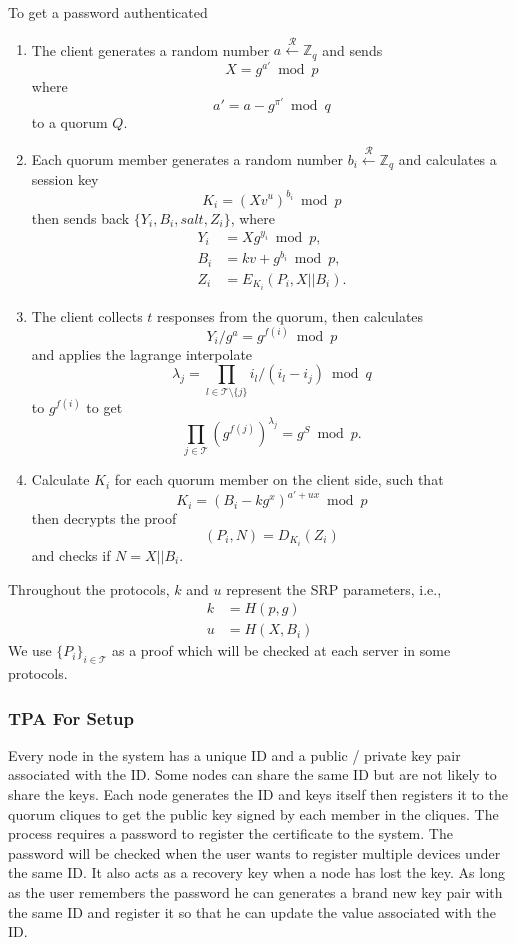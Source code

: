 To get a password authenticated
\begin{enumerate}
\item The client generates a random number
  $a \xleftarrow{\mathcal{R}} \mathbb{Z}_q$
  and sends
  \[
    X = g^{a'} \bmod p
  \]
  where
  \[
    a' = a - g^{\pi'} \bmod q
  \]
  to a quorum $Q$.
\item Each quorum member generates a random number
  $b_i \xleftarrow{\mathcal{R}} \mathbb{Z}_q$
  and calculates a session key
  \[ K_i = (Xv^u)^{b_i} \bmod p \]
  then sends back $\{Y_i, B_i, salt, Z_i\}$,
  where
  \begin{align*}
    Y_i &= X g^{y_i} \bmod p, \\
    B_i &= kv + g^{b_i} \bmod p, \\
    Z_i &= E_{K_i}(P_i, X ||B_i).
  \end{align*}
\item The client collects $t$ responses from the quorum, then
  calculates
  \[
    Y_i/g^a = g^{f(i)} \bmod p
  \]
  and applies the lagrange interpolate
  \[
    \lambda_j = \prod_{l \in \mathcal{T} \setminus \{j\}}
    i_l / (i_l - i_j) \bmod q
  \]
  to $g^{f(i)}$ 
  to get
  \[
    \prod_{j \in \mathcal{T}}(g^{f(j)})^{\lambda_j} = g^S \bmod p.
  \]
\item Calculate $K_i$ for each quorum member on the client side, such
  that
  \[
    K_i = (B_i - kg^x)^{a'+ux} \bmod p
  \]
  then decrypts the proof
  \[
    (P_i, N) = D_{K_i}(Z_i)
  \]
  and checks if $N = X||B_i$.
\end{enumerate}
Throughout the protocols, $k$ and $u$ represent the SRP parameters, i.e.,
\begin{align*}
  k &= H(p, g) \\
  u &= H(X, B_i)
\end{align*}
We use $\{P_i\}_{i \in \mathcal{T}}$ as a proof which will be
checked at each server in some protocols.

\subsubsection*{TPA For Setup}
Every node in the system has a unique ID and a public / private key
pair associated with the ID. Some nodes can share the same ID but are
not likely to share the keys. Each node generates the ID and keys
itself then registers it to the quorum cliques to get the public key
signed by each member in the cliques. The process requires a password
to register the certificate to the system. The password will be checked
when the user wants to register multiple devices under the
same ID. It also acts as a recovery key when a node has lost the
key. As long as the user remembers the password he can generates a
brand new key pair with the same ID and register it so that he can
update the value associated with the ID.\\

